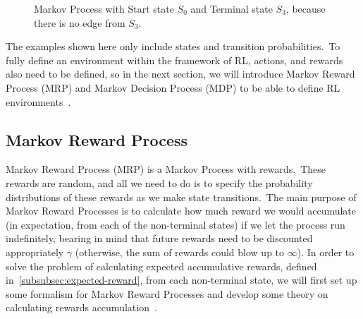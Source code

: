 \documentclass[../xlapes02]{subfiles}
\begin{document}
    \begin{figure}[h!]
        \begin{center}
            \caption{Markov Process with Start state $S_0$ and Terminal state $S_3$, because there is no edge from $S_3$.}
            \label{fig:markov-process}
        \end{center}
        \centering
    \end{figure}

    The examples shown here only include states and transition probabilities.\ To fully define an environment within the framework of RL, actions, and rewards also need to be defined, so in the next section, we will introduce Markov Reward Process (MRP) and Markov Decision Process (MDP) to be able to define RL environments~\cite{sutton2018reinforcement}.

    \subsection{Markov Reward Process}\label{subsec:markov-reward-process}
    Markov Reward Process (MRP) is a Markov Process with rewards.\ These rewards are random, and all we need to do is to specify the probability distributions of these rewards as we make state transitions.\ The main purpose of Markov Reward Processes is to calculate how much reward we would accumulate (in expectation, from each of the non-terminal states) if we let the process run indefinitely, bearing in mind that future rewards need to be discounted appropriately $\gamma$ (otherwise, the sum of rewards could blow up to $\infty$). In order to solve the problem of calculating expected accumulative rewards, defined in~\cref{subsubsec:expected-reward}, from each non-terminal state, we will first set up some formalism for Markov Reward Processes and develop some theory on calculating rewards accumulation~\cite{rao2022foundations}.
\end{document}
